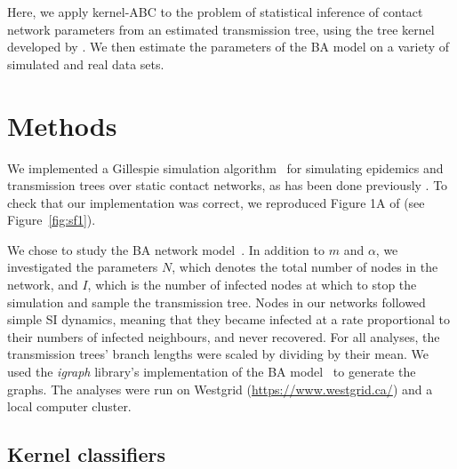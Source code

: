 \documentclass[12pt]{article}\usepackage[]{graphicx}\usepackage[]{color}
\newcommand{\software}[1]{\textit{#1}}
\begin{document}
Here, we apply kernel-\gls{ABC} to the problem of statistical inference of
contact network parameters from an estimated transmission tree, using the tree
kernel developed by \textcite{poon2013mapping}. We then estimate the parameters
of the \gls{BA} model on a variety of simulated and real data sets.

\section*{Methods}

We implemented a Gillespie simulation algorithm~\autocite{gillespie1976general}
for simulating epidemics and transmission trees over static contact networks,
as has been done previously \autocite[\textit{e.g.}][]{o2010contact,
robinson2013dynamics, leventhal2012inferring, groendyke2011bayesian}. To check
that our implementation was correct, we reproduced Figure 1A of
\textcite{leventhal2012inferring} (see Figure~\ref{fig:sf1}). 

We chose to study the \gls{BA} network model~\autocite{barabasi1999emergence}.
In addition to $m$ and $\alpha$, we investigated the parameters $N$, which
denotes the total number of nodes in the network, and $I$, which is the number
of infected nodes at which to stop the simulation and sample the transmission
tree. Nodes in our networks followed simple \gls{SI} dynamics, meaning that
they became infected at a rate proportional to their numbers of infected
neighbours, and never recovered. For all analyses, the transmission trees'
branch lengths were scaled by dividing by their mean. We used the 
\software{igraph} library's implementation of the \gls{BA}
model~\autocite{csardi2006igraph} to generate the graphs. The analyses were run
on Westgrid (\url{https://www.westgrid.ca/}) and a local computer cluster.

\subsection*{Kernel classifiers}
\end{document}
